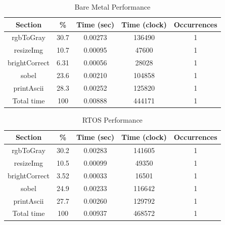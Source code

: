 \documentclass[conference,compsoc]{IEEEtran}
\begin{document}
  \begin{table}[h]
  \centering
  \caption{Bare Metal Performance}
  \begin{tabular}[t]{  ccccc  } 
  \hline
  Section & \% & Time (sec) & Time (clock)& Occurrences \\
  \hline
  rgbToGray & 30.7 & 0.00273 & 136490 & 1\\
  resizeImg& 10.7 & 0.00095 & 47600 & 1\\
  brightCorrect& 6.31 & 0.00056 & 28028 & 1\\
  sobel& 23.6 & 0.00210 & 104858 & 1\\
  printAscii& 28.3 & 0.00252 & 125820 & 1\\
  \hline
  Total time & 100 & 0.00888 & 444171 & 1\\ 
  \hline
  \end{tabular}
  \end{table}
  
  \begin{table}[h]
  \centering
  \caption{RTOS Performance}
  \begin{tabular}[t]{  ccccc } 
  \hline
  Section & \% & Time (sec) & Time (clock)& Occurrences \\
  \hline
  rgbToGray & 30.2 & 0.00283 & 141605 & 1\\
  resizeImg& 10.5 & 0.00099 & 49350 & 1\\
  brightCorrect& 3.52 & 0.00033 & 16501 & 1\\
  sobel& 24.9 & 0.00233 & 116642 & 1\\
  printAscii& 27.7 & 0.00260 & 129792 & 1\\
  \hline
  Total time & 100 & 0.00937 &468572 & 1 \\
  \hline
  \end{tabular}
  \end{table}
  
\end{document}
